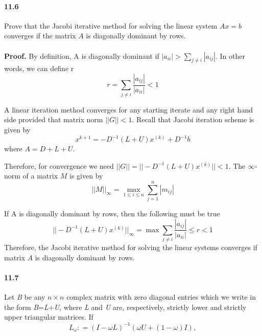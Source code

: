 \documentclass[a4paper, 11pt]{article}
\begin{document}
	\paragraph{11.6}
	Prove that the Jacobi iterative method for solving the linear system $Ax=b$ converges if the matrix $A$ is diagonally dominant by rows. \\ \\
	\textbf{Proof.} 
	By definition, A is diagonally dominant if $|a_{ii}| > \sum_{j \neq i} |a_{ij}|$. In other words, we can define r
	\begin{equation*}
	r = \sum_{j \neq i} \frac{|a_{ij}|}{|a_{ii}|} < 1
	\end{equation*}
	
	A linear iteration method converges for any starting iterate and
	any right hand side provided that matrix norm $|| G || < 1$.
	Recall that Jacobi iteration scheme is given by
	\begin{equation*}
	x^{k+1} = -D^{-1}(L+U)x^{(k)} + D^{-1}b
	\end{equation*}
	where $A = D + L + U$. 
	
	Therefore, for convergence we need $|| G || = ||-D^{-1}(L+U)x^{(k)}|| < 1$. 
	The $\infty$-norm of a matrix $M$ is given by 
	\begin{equation*}
	||M||_{\infty} = \max_{1\leq i\leq n} \sum_{j=1}^{n} |m_{ij}|
	\end{equation*}
	
	If A is diagonally dominant by rows, then the following must be true
	\begin{equation*}
	||-D^{-1}(L+U)x^{(k)}||_{\infty} = \max \sum_{j \neq i} \frac{|a_{ij}|}{|a_{ii}|} \leq r < 1
	\end{equation*}
	Therefore, the Jacobi iterative method for solving the linear systems converges if matrix $A$ is diagonally dominant by rows.
	
	\paragraph{11.7}
	
	\def\defeq{\mathrel{\mathop:}=}
	
	Let \emph{B} be any $n\times n$ complex matrix with
	zero diagonal entries which we write in the form \emph{B}=\emph{L}+\emph{U},
	where \emph{L} and \emph{U} are, respectively, strictly lower and
	strictly upper triangular matrices. If 
	\[
	L_{\omega}\defeq(I-\omega L)^{-1}(\omega U+(1-\omega)I),
	\]
	
\end{document}

